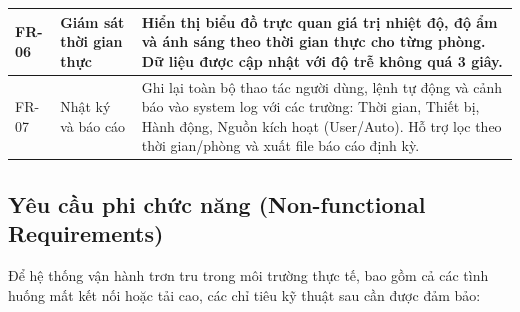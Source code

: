 \begin{table}[H]
\begin{tabular}{|m{2.2cm}|m{4cm}|m{7.5cm}|}
FR-06 & Giám sát thời gian thực & Hiển thị biểu đồ trực quan giá trị nhiệt độ, độ ẩm và ánh sáng theo thời gian thực cho từng phòng. Dữ liệu được cập nhật với độ trễ không quá 3 giây. \\ \hline

FR-07 & Nhật ký và báo cáo & Ghi lại toàn bộ thao tác người dùng, lệnh tự động và cảnh báo vào system log với các trường: Thời gian, Thiết bị, Hành động, Nguồn kích hoạt (User/Auto). Hỗ trợ lọc theo thời gian/phòng và xuất file báo cáo định kỳ. \\ \hline

\end{tabular}
\end{table}

\subsection{Yêu cầu phi chức năng (Non-functional Requirements)}

Để hệ thống vận hành trơn tru trong môi trường thực tế, bao gồm cả các tình huống mất kết nối hoặc tải cao, các chỉ tiêu kỹ thuật sau cần được đảm bảo:


